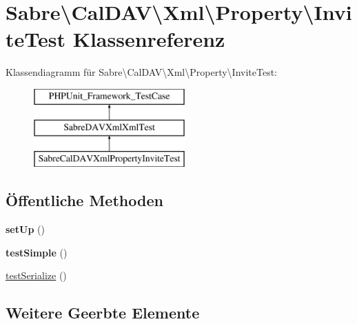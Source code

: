 \hypertarget{class_sabre_1_1_cal_d_a_v_1_1_xml_1_1_property_1_1_invite_test}{}\section{Sabre\textbackslash{}Cal\+D\+AV\textbackslash{}Xml\textbackslash{}Property\textbackslash{}Invite\+Test Klassenreferenz}
\label{class_sabre_1_1_cal_d_a_v_1_1_xml_1_1_property_1_1_invite_test}
Klassendiagramm für Sabre\textbackslash{}Cal\+D\+AV\textbackslash{}Xml\textbackslash{}Property\textbackslash{}Invite\+Test\+:\begin{figure}[H]
\begin{center}
\leavevmode
\includegraphics[height=3.000000cm]{class_sabre_1_1_cal_d_a_v_1_1_xml_1_1_property_1_1_invite_test}
\end{center}
\end{figure}
\subsection*{Öffentliche Methoden}
\begin{DoxyCompactItemize}
\item 
\mbox{\label{class_sabre_1_1_cal_d_a_v_1_1_xml_1_1_property_1_1_invite_test_aef823e203e10771539d4a587acd5b478}} 
{\bfseries set\+Up} ()
\item 
\mbox{\label{class_sabre_1_1_cal_d_a_v_1_1_xml_1_1_property_1_1_invite_test_af28f55a674b364879d67efec87fc580d}} 
{\bfseries test\+Simple} ()
\item 
\mbox{\hyperlink{class_sabre_1_1_cal_d_a_v_1_1_xml_1_1_property_1_1_invite_test_a47dac3a40c3d5b74443f77b6a24da947}{test\+Serialize}} ()
\end{DoxyCompactItemize}
\subsection*{Weitere Geerbte Elemente}



